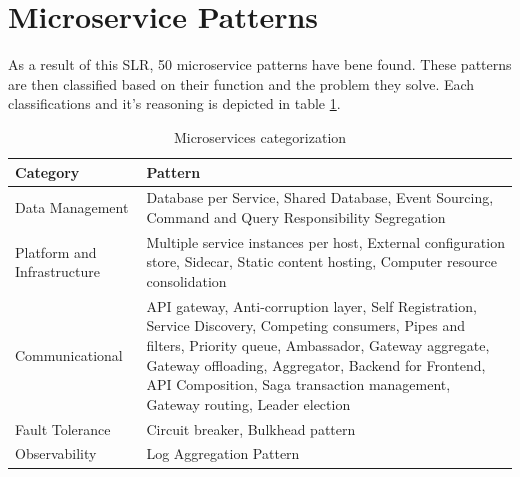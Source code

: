 \documentclass[conference]{IEEEtran}
\begin{document}
\section{Microservice Patterns}

As a result of this SLR, 50 microservice patterns have bene found. These patterns are then classified based on their function and the problem they solve. Each classifications and it's reasoning is depicted in table \ref{microservices-categorization}.
  
\begin{center}
    \begin{table}
    \renewcommand*{\arraystretch}{1.8}
    \begin{tabular}{ | m{3cm} | m{12cm} | }

        \hline

        Category & Pattern
 
        \\

        \hline

        Data Management &  Database per Service, Shared Database, Event Sourcing, Command and Query Responsibility Segregation
 
        \\

        \hline

        Platform and Infrastructure & Multiple service instances per host, External configuration store, Sidecar, Static content hosting, Computer resource consolidation
 
        \\

        \hline

        Communicational & API gateway,  Anti-corruption layer, Self Registration, Service Discovery, Competing consumers, Pipes and filters, Priority queue, Ambassador, Gateway aggregate, Gateway offloading, Aggregator, Backend for Frontend, API Composition, Saga transaction management, Gateway routing, Leader election
        
 
        \\

        \hline

        Fault Tolerance & Circuit breaker, Bulkhead pattern
 
        \\
        \hline

        Observability & Log Aggregation Pattern
 
        \\
        \hline


    \end{tabular}
    \caption{Microservices categorization}
    \label{microservices-categorization}
    \end{table}
\end{center}
\end{document}
